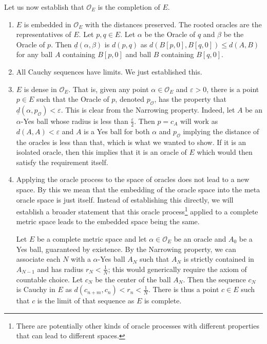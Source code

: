 \documentclass[12pt]{article}
\begin{document}
Let us now establish that $\mathcal{O}_E$ is the completion of $E$. 

\begin{enumerate}
    \item $E$ is embedded in $\mathcal{O}_E$ with the distances preserved. The rooted oracles are the representatives of $E$. Let $p, q \in E$. Let $\alpha$ be the Oracle of $q$ and $\beta$ be the Oracle of $p$. Then $\underline{d}(\alpha, \beta)$ is $d(p,q)$ as $d(B[p,0], B[q, 0]) \leq d(A, B)$ for any ball $A$ containing $B[p,0]$ and ball $B$ containing $B[q,0]$.  
    
    \item All Cauchy sequences have limits. We just established this. 

    \item $E$ is dense in $\mathcal{O}_E$. That is, given any point $\alpha \in \mathcal{O}_E$ and $\varepsilon > 0$, there is a point $p \in E$ such that the Oracle of $p$, denoted $p_\mathcal{O}$, has the property that $\underline{d}(\alpha, p_\mathcal{O}) < \varepsilon$. This is clear from the Narrowing property. Indeed, let $A$ be an $\alpha$-Yes ball whose radius is less than $\frac{\varepsilon}{2}$. Then $p = c_A$ will work as $d(A, A) < \varepsilon$ and $A$ is a Yes ball for both $\alpha$ and $p_{\mathcal{O}}$ implying the distance of the oracles is less than that, which is what we wanted to show. If it is an isolated oracle, then this implies that it is an oracle of $E$ which would then satisfy the requirement itself.

    \item Applying the oracle process to the space of oracles does not lead to a new space. By this we mean that the embedding of the oracle space into the meta oracle space is just itself. Instead of establishing this directly, we will establish a broader statement that this oracle process\footnote{There are potentially other kinds of oracle processes with different properties that can lead to different spaces.} applied to a complete metric space leads to the embedded space being the same. 

    Let $E$ be a complete metric space and let $\alpha \in \mathcal{O}_E$ be an oracle and $A_0$ be a Yes ball, guaranteed by existence. By the Narrowing property, we can associate each $N$ with a $\alpha$-Yes ball $A_N$ such that $A_N$ is strictly contained in $A_{N-1}$ and has radius $r_N < \frac{1}{N}$; this would generically require the axiom of countable choice. Let $c_N$ be the center of the ball $A_N$. Then the sequence $c_N$ is Cauchy in $E$ as $d(c_{n+m},  c_n) < r_n < \frac{1}{N}$. There is thus a point $c \in E$ such that $c$ is the limit of that sequence as $E$ is complete. 


\end{enumerate}
\end{document}
